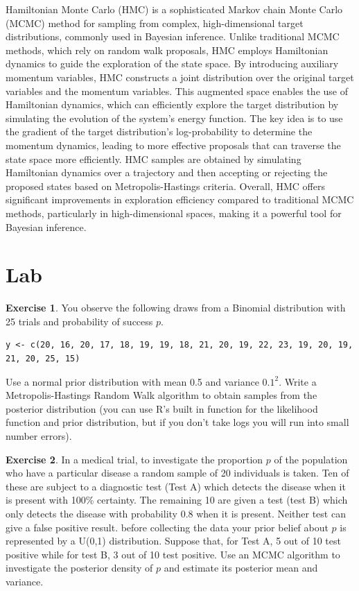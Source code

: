 \documentclass[
]{book}
\theoremstyle{definition}
\theoremstyle{definition}
\theoremstyle{definition}
\newtheorem{exercise}{Exercise}[chapter]
\theoremstyle{definition}
\theoremstyle{remark}
\begin{document}
Hamiltonian Monte Carlo (HMC) is a sophisticated Markov chain Monte Carlo (MCMC) method for sampling from complex, high-dimensional target distributions, commonly used in Bayesian inference. Unlike traditional MCMC methods, which rely on random walk proposals, HMC employs Hamiltonian dynamics to guide the exploration of the state space. By introducing auxiliary momentum variables, HMC constructs a joint distribution over the original target variables and the momentum variables. This augmented space enables the use of Hamiltonian dynamics, which can efficiently explore the target distribution by simulating the evolution of the system's energy function. The key idea is to use the gradient of the target distribution's log-probability to determine the momentum dynamics, leading to more effective proposals that can traverse the state space more efficiently. HMC samples are obtained by simulating Hamiltonian dynamics over a trajectory and then accepting or rejecting the proposed states based on Metropolis-Hastings criteria. Overall, HMC offers significant improvements in exploration efficiency compared to traditional MCMC methods, particularly in high-dimensional spaces, making it a powerful tool for Bayesian inference.

\hypertarget{lab-2}{%
\section{Lab}\label{lab-2}}

\begin{exercise}
You observe the following draws from a Binomial distribution with 25 trials and probability of success \(p\).

\begin{verbatim}
y <- c(20, 16, 20, 17, 18, 19, 19, 18, 21, 20, 19, 22, 23, 19, 20, 19, 21, 20, 25, 15)
\end{verbatim}

Use a normal prior distribution with mean 0.5 and variance \(0.1^2\). Write a Metropolis-Hastings Random Walk algorithm to obtain samples from the posterior distribution (you can use R's built in function for the likelihood function and prior distribution, but if you don't take logs you will run into small number errors).
\end{exercise}

\begin{exercise}
In a medical trial, to investigate the proportion \(p\) of the population who have a particular disease a random sample of 20 individuals is taken. Ten of these are subject to a diagnostic test (Test A) which detects the disease when it is present with 100\% certainty. The remaining 10 are given a test (test B) which only detects the disease with probability 0.8 when it is present. Neither test can give a false positive result. before collecting the data your prior belief about \(p\) is represented by a U(0,1) distribution. Suppose that, for Test A, 5 out of 10 test positive while for test B, 3 out of 10 test positive. Use an MCMC algorithm to investigate the posterior density of \(p\) and estimate its posterior mean and variance.
\end{exercise}
\end{document}

